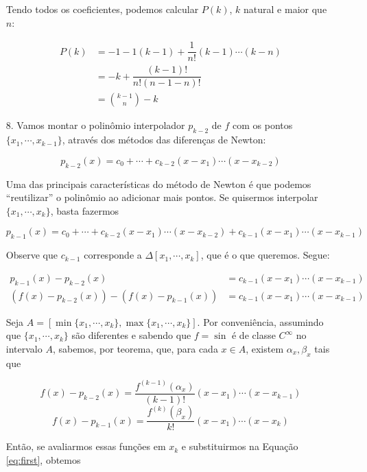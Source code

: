 \documentclass{article}
\begin{document}
\begin{enumerate}
            Tendo todos os coeficientes, podemos calcular $P(k)$, $k$ natural e maior que $n$:

            \begin{align*}
                P(k) &= -1-1(k-1)+\dfrac{1}{n!}(k-1)\cdots(k-n) \\
                &= -k + \dfrac{(k-1)!}{n!(n-1-n)!} \\
                &= {k-1\choose n} - k
            \end{align*}

        \pagebreak

        \item[8.] Vamos montar o polinômio interpolador $p_{k-2}$ de $f$ com os pontos $\{x_1, \cdots, x_{k-1}\}$, através dos métodos das diferenças de Newton:
            
            $$p_{k-2}(x) = c_0 + \cdots + c_{k-2} (x - x_1)\cdots(x - x_{k-2})$$

            Uma das principais características do método de Newton é que podemos ``reutilizar'' o polinômio
            ao adicionar mais pontos. Se quisermos interpolar $\{x_1, \cdots, x_k\}$, basta fazermos
            
            $$p_{k-1}(x) = c_0 + \cdots + c_{k-2} (x - x_1)\cdots(x - x_{k-2}) + c_{k-1} (x - x_1)\cdots(x - x_{k-1})$$

            Observe que $c_{k-1}$ corresponde a $\Delta[x_1, \cdots, x_k]$, que é o que queremos. Segue:

            \begin{align}
                p_{k-1}(x) - p_{k-2}(x) &= c_{k-1} (x - x_1)\cdots(x - x_{k-1}) \nonumber \\
                (f(x) - p_{k-2}(x)) - (f(x) - p_{k-1}(x)) & = c_{k-1} (x - x_1)\cdots(x - x_{k-1}) \label{eq:first}
            \end{align}

            Seja $A = [\min\{x_1, \cdots, x_k\}, \max\{x_1, \cdots, x_k\}]$.
            Por conveniência, assumindo que $\{x_1, \cdots, x_k\}$ são diferentes
            e sabendo que $f = \sin$ é de classe $C^\infty$ no intervalo $A$,
            sabemos, por teorema, que, para cada $x \in A$,
            existem $\alpha_x, \beta_x$
            tais que

            $$f(x) - p_{k-2}(x) = \dfrac{f^{(k-1)}(\alpha_x)}{(k-1)!}(x-x_1)\cdots(x-x_{k-1})$$
            $$f(x) - p_{k-1}(x) = \dfrac{f^{(k)}(\beta_x)}{k!}(x-x_1)\cdots(x-x_k)$$

            Então, se avaliarmos essas funções em $x_k$ e substituirmos na Equação \ref{eq:first}, obtemos


\end{enumerate}
\end{document}
